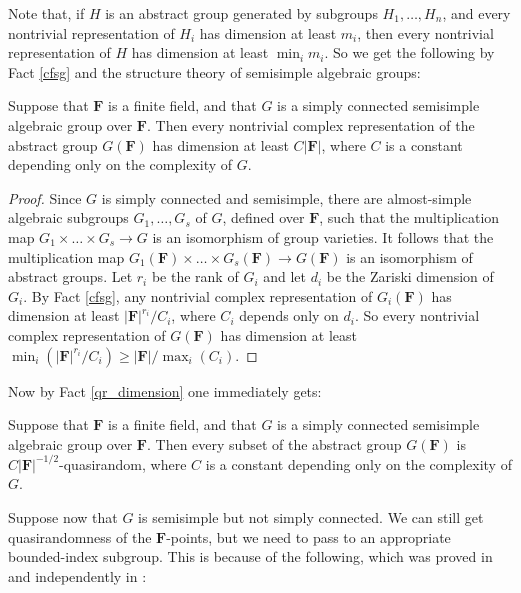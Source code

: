 \documentclass[10pt]{article}
\begin{document}
{Note that, if $H$ is an abstract group generated by subgroups $H_1,\dots,H_n$, and every nontrivial representation of $H_i$ has dimension at least $m_i$, then every nontrivial representation of $H$ has dimension at least $\min_im_i$. So we get the following by Fact \ref{cfsg} and the structure theory of semisimple algebraic groups:

\begin{corollary}
    Suppose that $\mathbf{F}$ is a finite field, and that $G$ is a simply connected semisimple algebraic group over $\mathbf{F}$. Then every nontrivial complex representation of the abstract group $G(\mathbf{F})$ has dimension at least $C|\mathbf{F}|$, where $C$ is a constant depending only on the complexity of $G$.
\end{corollary}
\begin{proof}
    Since $G$ is simply connected and semisimple, there are almost-simple algebraic subgroups $G_1,\dots,G_s$ of $G$, defined over $\mathbf{F}$, such that the multiplication map $G_1\times\dots\times G_s\to G$ is an isomorphism of group varieties. It follows that the multiplication map $G_1(\mathbf{F})\times\dots\times G_s(\mathbf{F})\to G(\mathbf{F})$ is an isomorphism of abstract groups. Let $r_i$ be the rank of $G_i$ and let $d_i$ be the Zariski dimension of $G_i$. By Fact \ref{cfsg}, any nontrivial complex representation of $G_i(\mathbf{F})$ has dimension at least $|\mathbf{F}|^{r_i}/C_i$, where $C_i$ depends only on $d_i$. So every nontrivial complex representation of $G(\mathbf{F})$ has dimension at least $\min_i(|\mathbf{F}|^{r_i}/C_i)\geqslant|\mathbf{F}|/\max_i(C_i)$.
\end{proof}

Now by Fact \ref{qr_dimension} one immediately gets:

\begin{corollary}\label{simply connected semisimple is quasirandom}
    Suppose that $\mathbf{F}$ is a finite field, and that $G$ is a simply connected semisimple algebraic group over $\mathbf{F}$. Then every subset of the abstract group $G(\mathbf{F})$ is $C|\mathbf{F}|^{-1/2}$-quasirandom, where $C$ is a constant depending only on the complexity of $G$.
\end{corollary}

Suppose now that $G$ is semisimple but not simply connected. We can still get quasirandomness of the $\mathbf{F}$-points, but we need to pass to an appropriate bounded-index subgroup. This is because of the following, which was proved in \cite{hrushovski_pillay_2} and independently in \cite{sclosa}:

}
\end{document}
